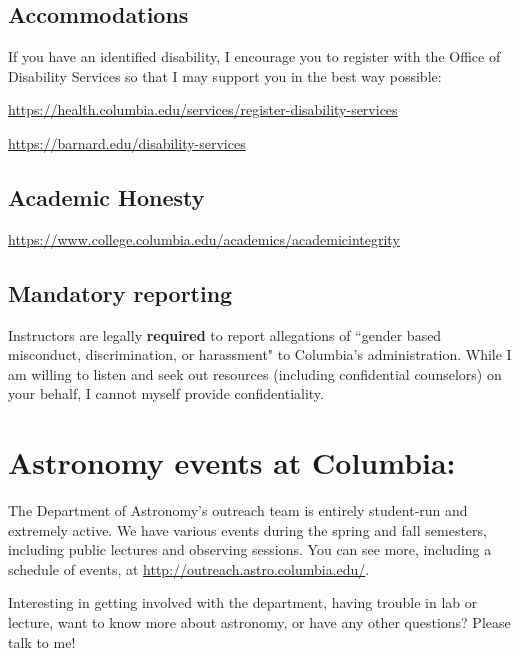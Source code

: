 \documentclass[11pt]{article}
\begin{document}
\subsection*{Accommodations}
If you have an identified disability, I encourage you to register with the Office of Disability Services so that I may support you in the best way possible: 

\href{https://health.columbia.edu/services/register-disability-services}{https://health.columbia.edu/services/register-disability-services} 

\href{https://barnard.edu/disability-services}{https://barnard.edu/disability-services}
 
\subsection*{Academic Honesty}
\href{https://www.college.columbia.edu/academics/academicintegrity}{https://www.college.columbia.edu/academics/academicintegrity}
 
\subsection*{Mandatory reporting}
Instructors are legally \textbf{required} to report allegations of ``gender based misconduct, discrimination, or harassment" to Columbia's administration. While I am willing to listen and seek out resources (including confidential counselors) on your behalf, I cannot myself provide confidentiality.

\section*{Astronomy events at Columbia:}

\noindent The Department of Astronomy's outreach team is entirely student-run and extremely active. We have various events during the spring and fall semesters, including public lectures and observing sessions. You can see more, including a schedule of events, at \href{http://outreach.astro.columbia.edu/}{http://outreach.astro.columbia.edu/}. 

Interesting in getting involved with the department, having trouble in lab or lecture, want to know more about astronomy, or have any other questions? Please talk to me!
\end{document}
